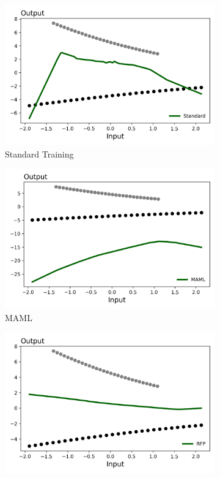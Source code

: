 \documentclass[a4paper,12pt]{article}
\begin{document}
\begin{figure}[htbp]
\centering
\begin{subfigure}{.32\textwidth}
    \centering
    \includegraphics[width=.95\linewidth]{figures/framework/grad_desc_toy_Standard.png}
    \caption{Standard Training}
    \label{fig:overfittails}
\end{subfigure}
\begin{subfigure}{.32\textwidth}
    \centering
    \includegraphics[width=.95\linewidth]{figures/framework/grad_desc_toy_MAML.png}
        \caption{MAML}
    \label{fig:wrongspace}
\end{subfigure}
\begin{subfigure}{.32\textwidth}
    \centering
    \includegraphics[width=.95\linewidth]{figures/framework/grad_desc_toy_RFP.png}

\end{subfigure}
\end{figure}
\end{document}
